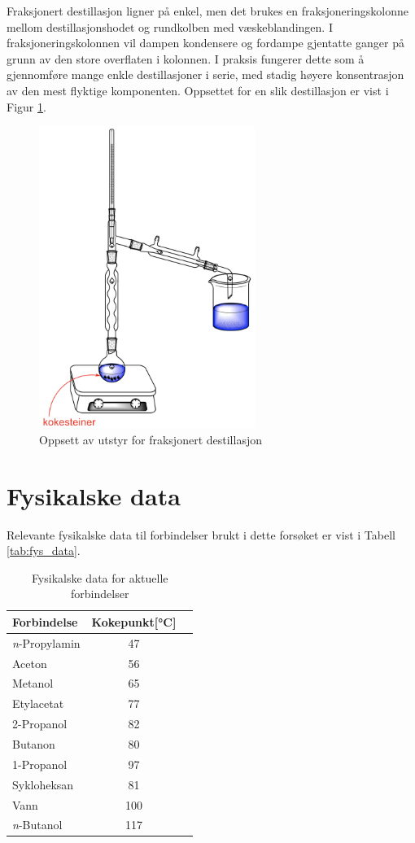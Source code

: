 Fraksjonert destillasjon ligner på enkel, men det brukes en fraksjoneringskolonne mellom destillasjonshodet og rundkolben med væskeblandingen. I fraksjoneringskolonnen vil dampen kondensere og fordampe gjentatte ganger på grunn av den store overflaten i kolonnen. I praksis fungerer dette som å gjennomføre mange enkle destillasjoner i serie, med stadig høyere konsentrasjon av den mest flyktige komponenten. Oppsettet for en slik destillasjon er vist i Figur \ref{fig:fraksjonert}.

\begin{figure}[htb!]
    \centering
    \includegraphics[width=7cm]{Figurer/Fraksjonert_destillasjon.png}
    \caption{Oppsett av utstyr for fraksjonert destillasjon}
    \label{fig:fraksjonert}
\end{figure}


\section{Fysikalske data}
Relevante fysikalske data til forbindelser brukt i dette forsøket er vist i Tabell \ref{tab:fys_data}.
\begin{table}[ht!]
	\begin{center}
		\caption{Fysikalske data for aktuelle forbindelser \cite{CRC}}
		\label{tab:fysdata}
		\begin{tabular}{l c c}
		\toprule
		Forbindelse & Kokepunkt[\si{\celsius}]\\
		\midrule
		\textit{n}-Propylamin & 47\\
		Aceton & 56\\
		Metanol & 65 \\
		Etylacetat & 77 \\
		2-Propanol & 82 \\
		Butanon & 80 \\
		1-Propanol & 97 \\
		Sykloheksan & 81 \\
		Vann & 100 \\
		\textit{n}-Butanol & 117 \\
		\bottomrule
		\end{tabular}
	\end{center}
\end{table}



